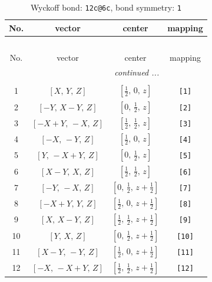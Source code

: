 \documentclass[fleqn,8pt]{jsarticle}
\begin{document}
\begin{longtable}{cccc}
\caption{Wyckoff bond: {\tt 12c@6c}, bond symmetry: {\tt 1}}
 \\
 \hline \hline
No. & vector & center & mapping \\ \hline \endfirsthead

\multicolumn{3}{l}{\tablename\ \thetable{}} \\
 \hline \hline
No. & vector & center & mapping \\ \hline \endhead

 \hline \hline
\multicolumn{3}{r}{\footnotesize\it continued ...} \\ \endfoot

 \hline \hline
\multicolumn{3}{r}{} \\ \endlastfoot

1 & $\left[ X,\, Y,\, Z \right]$ & $\left[ \frac{1}{2},\, 0,\, z \right]$ & {\tt [1]} \\ \hline
2 & $\left[ - Y,\, X - Y,\, Z \right]$ & $\left[ 0,\, \frac{1}{2},\, z \right]$ & {\tt [2]} \\ \hline
3 & $\left[ - X + Y,\, - X,\, Z \right]$ & $\left[ \frac{1}{2},\, \frac{1}{2},\, z \right]$ & {\tt [3]} \\ \hline
4 & $\left[ - X,\, - Y,\, Z \right]$ & $\left[ \frac{1}{2},\, 0,\, z \right]$ & {\tt [4]} \\ \hline
5 & $\left[ Y,\, - X + Y,\, Z \right]$ & $\left[ 0,\, \frac{1}{2},\, z \right]$ & {\tt [5]} \\ \hline
6 & $\left[ X - Y,\, X,\, Z \right]$ & $\left[ \frac{1}{2},\, \frac{1}{2},\, z \right]$ & {\tt [6]} \\ \hline
7 & $\left[ - Y,\, - X,\, Z \right]$ & $\left[ 0,\, \frac{1}{2},\, z + \frac{1}{2} \right]$ & {\tt [7]} \\ \hline
8 & $\left[ - X + Y,\, Y,\, Z \right]$ & $\left[ \frac{1}{2},\, 0,\, z + \frac{1}{2} \right]$ & {\tt [8]} \\ \hline
9 & $\left[ X,\, X - Y,\, Z \right]$ & $\left[ \frac{1}{2},\, \frac{1}{2},\, z + \frac{1}{2} \right]$ & {\tt [9]} \\ \hline
10 & $\left[ Y,\, X,\, Z \right]$ & $\left[ 0,\, \frac{1}{2},\, z + \frac{1}{2} \right]$ & {\tt [10]} \\ \hline
11 & $\left[ X - Y,\, - Y,\, Z \right]$ & $\left[ \frac{1}{2},\, 0,\, z + \frac{1}{2} \right]$ & {\tt [11]} \\ \hline
12 & $\left[ - X,\, - X + Y,\, Z \right]$ & $\left[ \frac{1}{2},\, \frac{1}{2},\, z + \frac{1}{2} \right]$ & {\tt [12]} \\
\end{longtable}
\end{document}
